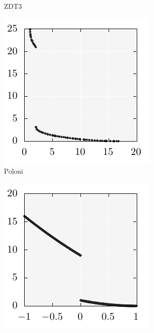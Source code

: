 \documentclass{stdlocal}
\begin{document}
\begin{figure}[t]
\begin{subfigure}[b]{0.24\textwidth}
        \caption{ZDT3}
      \end{subfigure}
      \begin{subfigure}[b]{0.24\textwidth}
        \center
        \includegraphics[width=\textwidth]{../../plots/poloni2.pdf}
        \caption{Poloni}
      \end{subfigure}
      \begin{subfigure}[b]{0.24\textwidth}
        \center
        \includegraphics[width=\textwidth]{../../plots/schaffer2.pdf}

\end{subfigure}
\end{figure}
\end{document}
